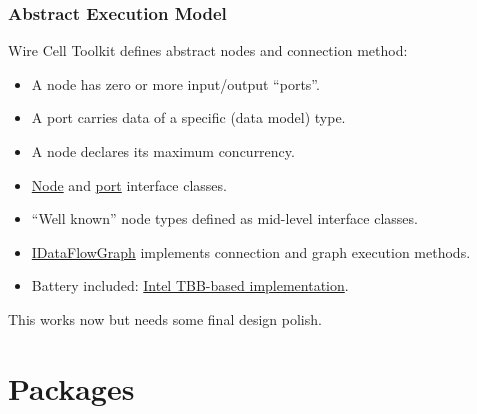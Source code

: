 \documentclass[xcolor=dvipsnames]{beamer}
\begin{document}
\begin{frame}
  \frametitle{Abstract Execution Model}
  Wire Cell Toolkit defines abstract nodes and connection method:
  \begin{itemize}
  \item A node has zero or more input/output ``ports''.
  \item A port carries data of a specific (data model) type.
  \item A node declares its maximum concurrency.
  \item \href{https://github.com/WireCell/wire-cell-iface/blob/master/inc/WireCellIface/INode.h}{Node} and 
    \href{https://github.com/WireCell/wire-cell-iface/blob/master/inc/WireCellIface/IPort.h}{port} interface classes.
  \item ``Well known'' node types defined as mid-level interface classes. 
  \item
    \href{https://github.com/WireCell/wire-cell-iface/blob/master/inc/WireCellIface/IDataFlowGraph.h}{IDataFlowGraph}
    implements connection and graph execution methods.
  \item Battery included: \href{https://github.com/WireCell/wire-cell-tbb}{Intel TBB-based implementation}.
  \end{itemize}
  This works now but needs some final design polish.
\end{frame}

\section{Packages}
\end{document}
